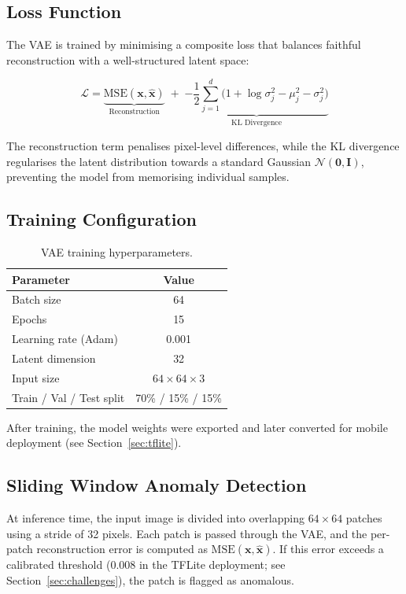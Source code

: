 \subsection{Loss Function}

The VAE is trained by minimising a composite loss that balances faithful reconstruction with a well-structured latent space:

\begin{equation}
\mathcal{L} = \underbrace{\text{MSE}(\mathbf{x}, \hat{\mathbf{x}})}_{\text{Reconstruction}} \;+\; \underbrace{-\frac{1}{2}\sum_{j=1}^{d}\bigl(1 + \log\sigma_j^{2} - \mu_j^{2} - \sigma_j^{2}\bigr)}_{\text{KL Divergence}}
\end{equation}

The reconstruction term penalises pixel-level differences, while the KL divergence regularises the latent distribution towards a standard Gaussian $\mathcal{N}(\mathbf{0}, \mathbf{I})$, preventing the model from memorising individual samples.

\subsection{Training Configuration}

\begin{table}[H]
\centering
\caption{VAE training hyperparameters.}
\label{tab:vae_training}
\begin{tabular}{|l|c|}
\hline
\textbf{Parameter} & \textbf{Value} \\ \hline
Batch size & 64 \\ \hline
Epochs & 15 \\ \hline
Learning rate (Adam) & 0.001 \\ \hline
Latent dimension & 32 \\ \hline
Input size & $64 \times 64 \times 3$ \\ \hline
Train / Val / Test split & 70\% / 15\% / 15\% \\ \hline
\end{tabular}
\end{table}

After training, the model weights were exported and later converted for mobile deployment (see Section~\ref{sec:tflite}).

\subsection{Sliding Window Anomaly Detection}

At inference time, the input image is divided into overlapping $64 \times 64$ patches using a stride of 32 pixels. Each patch is passed through the VAE, and the per-patch reconstruction error is computed as $\text{MSE}(\mathbf{x}, \hat{\mathbf{x}})$. If this error exceeds a calibrated threshold (0.008 in the TFLite deployment; see Section~\ref{sec:challenges}), the patch is flagged as anomalous.

